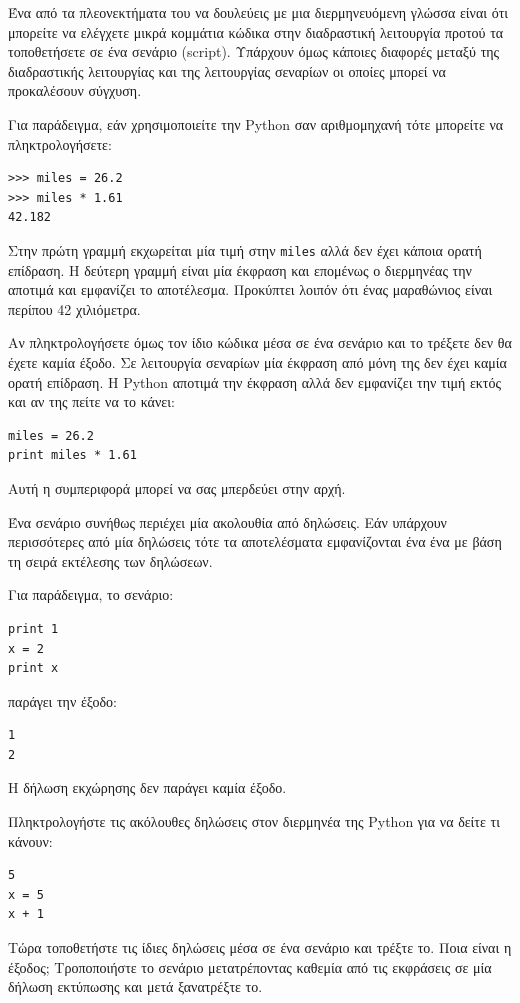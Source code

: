 \documentclass[10pt]{book}
\begin{document}
Ένα από τα πλεονεκτήματα του να δουλεύεις με μια διερμηνευόμενη γλώσσα
είναι ότι μπορείτε να ελέγχετε μικρά κομμάτια κώδικα στην διαδραστική
λειτουργία προτού τα τοποθετήσετε σε ένα σενάριο (script). Υπάρχουν όμως κάποιες διαφορές μεταξύ της διαδραστικής λειτουργίας και της λειτουργίας σεναρίων οι οποίες μπορεί να προκαλέσουν σύγχυση.

Για παράδειγμα, εάν χρησιμοποιείτε την  Python  σαν αριθμομηχανή τότε 
μπορείτε να πληκτρολογήσετε:

\begin{verbatim}
>>> miles = 26.2
>>> miles * 1.61
42.182
\end{verbatim}

Στην πρώτη γραμμή εκχωρείται μία τιμή στην {\tt miles} αλλά 
δεν έχει κάποια ορατή επίδραση.  Η δεύτερη γραμμή είναι μία έκφραση και 
επομένως ο διερμηνέας την αποτιμά και εμφανίζει το αποτέλεσμα.  Προκύπτει 
λοιπόν ότι ένας μαραθώνιος είναι περίπου 42 χιλιόμετρα.

Αν πληκτρολογήσετε όμως τον ίδιο κώδικα μέσα σε ένα σενάριο και το
τρέξετε δεν θα έχετε καμία έξοδο.  Σε λειτουργία σεναρίων μία έκφραση 
από μόνη της δεν έχει καμία ορατή επίδραση.  Η Python αποτιμά 
την έκφραση αλλά δεν εμφανίζει την τιμή εκτός και αν της πείτε να το κάνει:


\begin{verbatim}
miles = 26.2
print miles * 1.61
\end{verbatim}

Αυτή η συμπεριφορά μπορεί να σας μπερδεύει στην αρχή.

Ένα σενάριο συνήθως περιέχει μία ακολουθία από δηλώσεις.  Εάν
υπάρχουν περισσότερες από μία δηλώσεις τότε τα αποτελέσματα εμφανίζονται
ένα ένα με βάση τη σειρά εκτέλεσης των δηλώσεων.

Για παράδειγμα, το σενάριο:

\begin{verbatim}
print 1
x = 2
print x
\end{verbatim}
%

παράγει την έξοδο:

\begin{verbatim}
1
2
\end{verbatim}
%

Η δήλωση εκχώρησης δεν παράγει καμία έξοδο.\\

\begin{exercise}

Πληκτρολογήστε τις ακόλουθες δηλώσεις στον διερμηνέα της  Python 
για να δείτε τι κάνουν:


\begin{verbatim}
5
x = 5
x + 1
\end{verbatim}
%

Τώρα τοποθετήστε τις ίδιες δηλώσεις μέσα σε ένα σενάριο και τρέξτε το.
Ποια είναι η έξοδος; Τροποποιήστε το σενάριο μετατρέποντας καθεμία από
τις εκφράσεις σε μία δήλωση εκτύπωσης και μετά ξανατρέξτε το.
\end{exercise}
\end{document}
